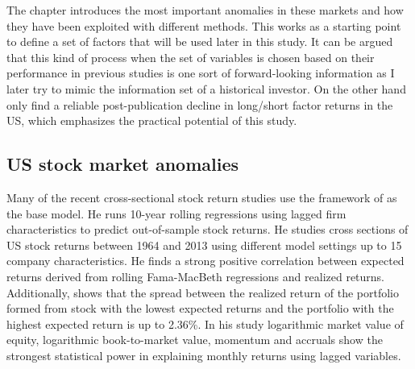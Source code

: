 \documentclass[12pt]{article}
\begin{document}
The chapter introduces the most important anomalies in these markets and how they have been exploited with different methods. This works as a starting point to define a set of factors that will be used later in this study. It can be argued that this kind of process when the set of variables is chosen based on their performance in previous studies is one sort of forward-looking information as I later try to mimic the information set of a historical investor. On the other hand \citet{JACOBS2020213} only find a reliable post-publication decline in long/short factor returns in the US, which emphasizes the practical potential of this study.\footnotemark {}  \par

\subsection{US stock market anomalies}\label{USStockMarketAnomalies}

Many of the recent cross-sectional stock return studies use the framework of \citet{Lewellen2015} as the base model. He runs 10-year rolling \citet{FamaMacBeth1973} regressions using lagged firm characteristics to predict out-of-sample stock returns. He studies cross sections of US stock returns between 1964 and 2013 using different model settings up to 15 company characteristics.\footnotemark {} He finds a strong positive correlation between expected returns derived from rolling Fama-MacBeth regressions and realized returns. Additionally, \citeauthor{Lewellen2015} shows that the spread between the realized return of the portfolio formed from stock with the lowest expected returns and the portfolio with the highest expected return is up to 2.36\%. In his study logarithmic market value of equity, logarithmic book-to-market value, momentum and accruals show the strongest statistical power in explaining monthly returns using lagged variables.\footnotemark {} \par
\end{document}
